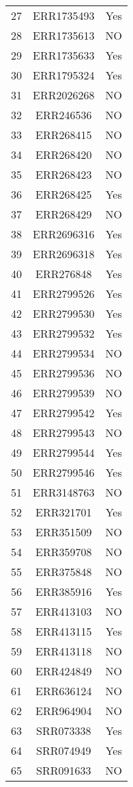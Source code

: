 \begin{longtable}{ccc}
  27 & ERR1735493 & Yes \\ 
  28 & ERR1735613 & NO \\ 
  29 & ERR1735633 & Yes \\ 
  30 & ERR1795324 & Yes \\ 
  31 & ERR2026268 & NO \\ 
  32 & ERR246536 & NO \\ 
  33 & ERR268415 & NO \\ 
  34 & ERR268420 & NO \\ 
  35 & ERR268423 & NO \\ 
  36 & ERR268425 & Yes \\ 
  37 & ERR268429 & NO \\ 
  38 & ERR2696316 & Yes \\ 
  39 & ERR2696318 & Yes \\ 
  40 & ERR276848 & Yes \\ 
  41 & ERR2799526 & Yes \\ 
  42 & ERR2799530 & Yes \\ 
  43 & ERR2799532 & Yes \\ 
  44 & ERR2799534 & NO \\ 
  45 & ERR2799536 & NO \\ 
  46 & ERR2799539 & NO \\ 
  47 & ERR2799542 & Yes \\ 
  48 & ERR2799543 & NO \\ 
  49 & ERR2799544 & Yes \\ 
  50 & ERR2799546 & Yes \\ 
  51 & ERR3148763 & NO \\ 
  52 & ERR321701 & Yes \\ 
  53 & ERR351509 & NO \\ 
  54 & ERR359708 & NO \\ 
  55 & ERR375848 & NO \\ 
  56 & ERR385916 & Yes \\ 
  57 & ERR413103 & NO \\ 
  58 & ERR413115 & Yes \\ 
  59 & ERR413118 & NO \\ 
  60 & ERR424849 & NO \\ 
  61 & ERR636124 & NO \\ 
  62 & ERR964904 & NO \\ 
  63 & SRR073338 & Yes \\ 
  64 & SRR074949 & Yes \\ 
  65 & SRR091633 & NO \\ 

\end{longtable}
